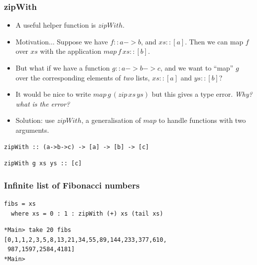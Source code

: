 \documentclass{beamer}
\begin{document}
\begin{frame}[fragile]
\frametitle{zipWith}

\begin{itemize}
\item A useful helper function is $zipWith$.
\item Motivation$\ldots$ Suppose we have $f :: a->b$, and $xs ::
  [a]$.  Then we can map $f$ over $xs$ with the application $map\, f\,
  xs :: [b]$.
\item But what if we have a function $g :: a -> b -> c$, and we
  want to ``map'' $g$ over the corresponding elements of \emph{two}
  lists, $xs :: [a]$ and $ys :: [b]$?
\item It would be nice to write $map \,g\, (zip\, xs\, ys)$ but this gives
  a type error.  \emph{Why?  what is the error?}
\item Solution: use $zipWith$, a generalisation of $map$ to handle
  functions with two arguments.
\end{itemize}

\begin{verbatim}
zipWith :: (a->b->c) -> [a] -> [b] -> [c]
\end{verbatim}

\begin{verbatim}
zipWith g xs ys :: [c]
\end{verbatim}

\end{frame}

\begin{frame}[fragile]
\frametitle{Infinite list of Fibonacci numbers}

\begin{verbatim}
fibs = xs
  where xs = 0 : 1 : zipWith (+) xs (tail xs)
\end{verbatim}

\begin{verbatim}
*Main> take 20 fibs
[0,1,1,2,3,5,8,13,21,34,55,89,144,233,377,610,
 987,1597,2584,4181]
*Main> 
\end{verbatim}

\end{frame}
\end{document}
